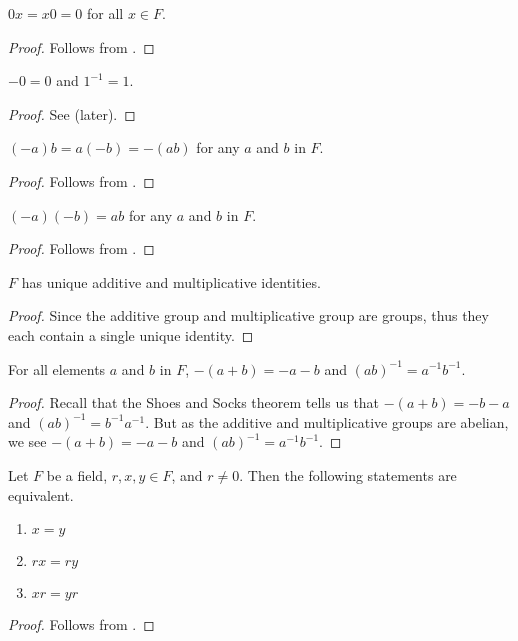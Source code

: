 \begin{proposition}
    $0x = x0 = 0$ for all $x \in F$.
\end{proposition}
\begin{proof}
    Follows from .
\end{proof}

\begin{proposition}
    $-0 = 0$ and $1^{-1} = 1$.
\end{proposition}
\begin{proof}
    See  (later).
\end{proof}

\begin{proposition}
    $(-a)b = a(-b) = -(ab)$ for any $a$ and $b$ in $F$.
\end{proposition}
\begin{proof}
    Follows from .
\end{proof}

\begin{proposition}
    $(-a)(-b) = ab$ for any $a$ and $b$ in $F$.
\end{proposition}
\begin{proof}
    Follows from .
\end{proof}

\begin{proposition}
    $F$ has unique additive and multiplicative identities.
\end{proposition}
\begin{proof}
    Since the additive group and multiplicative group are groups, thus they each contain a single unique identity.
\end{proof}

\begin{proposition}
    For all elements $a$ and $b$ in $F$, $-(a+b) = -a-b$ and $(ab)^{-1} = a^{-1}b^{-1}$.
\end{proposition}
\begin{proof}
    Recall that the Shoes and Socks theorem tells us that $-(a+b) = -b - a$ and $(ab)^{-1} = b^{-1}a^{-1}$. But as the additive and multiplicative groups are abelian, we see $-(a+b) = -a-b$ and $(ab)^{-1} = a^{-1}b^{-1}$.
\end{proof}

\begin{proposition}
    Let $F$ be a field, $r, x, y \in F$, and $r \neq 0$. Then the following statements are equivalent.
    \begin{enumerate}
        \item $x = y$
        \item $rx = ry$
        \item $xr = yr$
    \end{enumerate}
\end{proposition}
\begin{proof}
    Follows from .
\end{proof}

